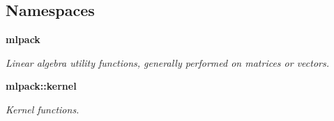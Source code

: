 \subsection*{Namespaces}
\begin{DoxyCompactItemize}
\item 
 {\bf mlpack}
\begin{DoxyCompactList}\small\item\em Linear algebra utility functions, generally performed on matrices or vectors. \end{DoxyCompactList}\item 
 {\bf mlpack\+::kernel}
\begin{DoxyCompactList}\small\item\em Kernel functions. \end{DoxyCompactList}\end{DoxyCompactItemize}
